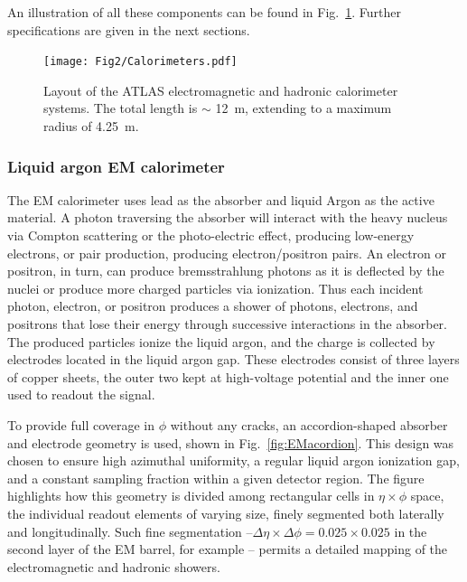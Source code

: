 An illustration of all these components can be found in Fig.~\ref{fig:figcalo}. Further specifications are given in the next sections.


\begin{figure}[htbp]
  \begin{center}
      \texttt{[image: Fig2/Calorimeters.pdf]}
    \caption{Layout of the ATLAS electromagnetic and hadronic calorimeter systems. The total length is $\sim$ 12~m, extending to a maximum radius of 4.25~m.}
    \label{fig:figcalo}
  \end{center}
\end{figure}


\subsubsection{Liquid argon EM calorimeter}
  
The EM calorimeter uses lead as the absorber and liquid Argon as the active material. A photon traversing the absorber will interact with the heavy nucleus via Compton scattering or the photo-electric effect, producing low-energy electrons, or pair production, producing electron/positron pairs. An electron or positron, in turn, can produce bremsstrahlung photons as it is deflected by the nuclei or produce more charged particles via ionization. Thus each incident photon, electron, or positron produces a shower of photons, electrons, and positrons that lose their energy through successive interactions in the absorber. The produced particles ionize the liquid argon, and the charge is collected by electrodes located in the liquid argon gap.  These electrodes consist of three layers of copper sheets, the outer two kept at high-voltage potential and the inner one used to readout the signal.

To provide full coverage in $\phi$ without any cracks, an accordion-shaped absorber and electrode geometry is used, shown in Fig.~\ref{fig:EMacordion}.  This design was chosen to ensure high azimuthal uniformity, a regular liquid argon ionization gap, and a constant sampling fraction within a given detector region. The figure highlights  how this geometry is divided among rectangular cells in $\eta \times \phi$ space, the individual readout elements of varying size,  finely segmented both laterally and longitudinally. Such fine segmentation $– \Delta \eta \times \Delta \phi = 0.025 \times 0.025$ in the second layer of the EM barrel, for example $–$ permits a detailed mapping of the electromagnetic and hadronic showers. 

